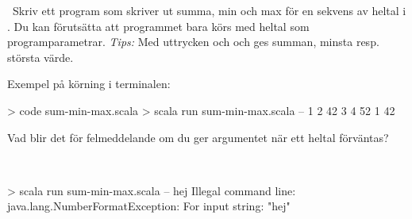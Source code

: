 \begin{ConceptConnections}

\end{ConceptConnections}


\SOLUTION

\TaskSolved \what

\Subtask

\begin{ConceptConnections}

\end{ConceptConnections}

\Subtask

\begin{ConceptConnections}

\end{ConceptConnections}

\Subtask

\begin{ConceptConnections}

\end{ConceptConnections}

\QUESTEND








\QUESTBEGIN

\Task \what~Skriv ett program som skriver ut summa, min och max för en sekvens av heltal i . Du kan förutsätta att programmet bara körs med heltal som programparametrar. \emph{Tips:} Med uttrycken  och  och  ges summan, minsta resp. största värde.

Exempel på körning i terminalen:
\begin{REPL}
> code sum-min-max.scala
> scala run sum-min-max.scala -- 1 2 42 3 4
52 1 42
\end{REPL}
Vad blir det för felmeddelande om du ger argumentet  när ett heltal förväntas? 

\SOLUTION

\TaskSolved \what~


\begin{REPLnonum}
> scala run sum-min-max.scala -- hej
Illegal command line: java.lang.NumberFormatException: For input string: "hej"
\end{REPLnonum}

